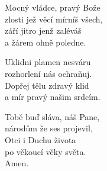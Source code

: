 \begin{translatioMulticol}{3}
Mocný vládce, pravý Bože\\
zlosti jež věcí mírníš všech,\\
září jitro jenž zaléváš\\
a žárem ohně poledne.\columnbreak

Uklidni plamen nesváru\\
rozhorlení nás ochraňuj.\\
Dopřej tělu zdravý klid\\
a mír pravý našim srdcím.\columnbreak

Tobě buď sláva, náš Pane,\\
národům že ses projevil,\\
Otci i Duchu života\\
po věkoucí věky světa.\\
Amen.
\end{translatioMulticol}
